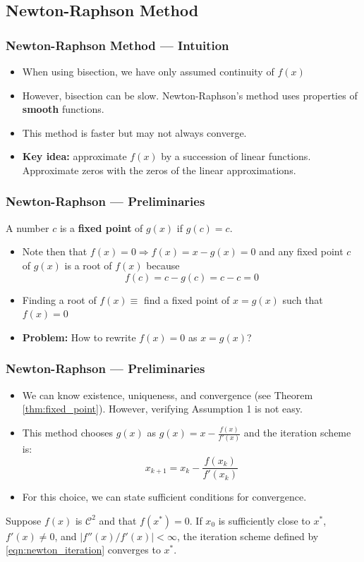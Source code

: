 \documentclass[11pt,xcolor={svgnames},aspectratio=169,usepdftitle=false,notheorems]{beamer}
\begin{document}
\subsection{Newton-Raphson Method}

\begin{frame}
  \frametitle{Newton-Raphson Method --- Intuition}
\begin{itemize}
  \item When using bisection, we have only assumed continuity of $f(x)$
  \item However, bisection can be slow. Newton-Raphson's method uses properties of \alert{\textbf{smooth}} functions.
  \item This method is faster but may not always converge.
  \item \alert{\textbf{Key idea:}} approximate $f(x)$ by a succession of linear functions. Approximate zeros with the zeros of the linear approximations.
\end{itemize}
\end{frame}

\begin{frame}
  \frametitle{Newton-Raphson --- Preliminaries}
\begin{definition}
A number $c$ is a \alert{\textbf{fixed point}} of $g(x)$ if $g(c) = c$.
\end{definition}
\begin{itemize}
  \item Note then that $f(x) = 0 \Rightarrow f(x) = x - g(x) = 0$ and any fixed point $c$ of $g(x)$ is a root of $f(x)$ because
  \[
  f(c) = c - g(c) = c - c = 0
  \]
  \item Finding a root of $f(x) \equiv$ find a fixed point of  $x = g(x)$ such that $f(x) = 0$
  \item \alert{\textbf{Problem:}} How to rewrite $f(x) = 0$ as $x = g(x)$?
\end{itemize}
\end{frame}

\begin{frame}
  \frametitle{Newton-Raphson --- Preliminaries}
\begin{itemize}
  \item We can know existence, uniqueness, and convergence (see Theorem \ref{thm:fixed_point}). However, verifying Assumption 1 is not easy.
  \item This method chooses $g(x)$ as $g(x) = x - \frac{f(x)}{f'(x)}$ and the iteration scheme is:
  \begin{equation}
  x_{k+1} = x_k - \frac{f(x_k)}{f'(x_k)} \label{eqn:newton_iteration}
  \end{equation}
  \item For this choice, we can state sufficient conditions for convergence.
\end{itemize}

\begin{theorem}
Suppose $f(x)$ is $\mathcal{C}^2$ and that $f(x^*) = 0$. If $x_0$ is sufficiently close to $x^*$, $f'(x)\neq 0$, and $\lvert f''(x) / f'(x)\rvert < \infty$, the iteration scheme defined by \eqref{eqn:newton_iteration} converges to $x^*$.
\end{theorem}
\end{frame}
\end{document}
